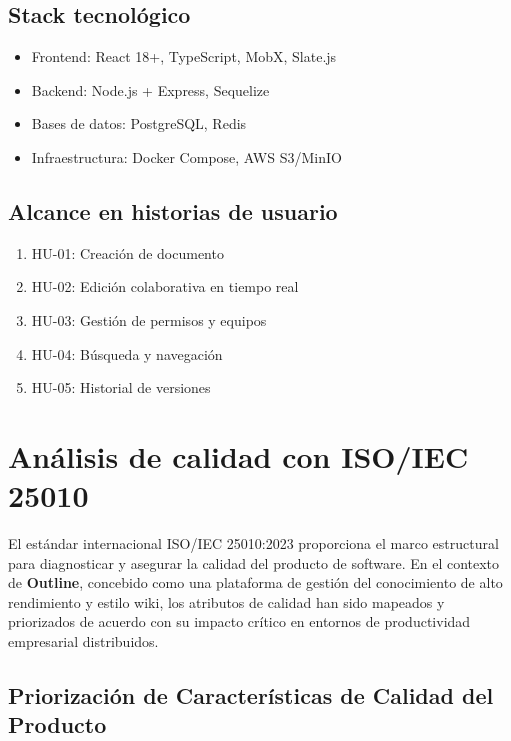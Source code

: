 \documentclass[12pt]{article}
\begin{document}
\subsection{Stack tecnológico}
\begin{itemize}
    \item Frontend: React 18+, TypeScript, MobX, Slate.js
    \item Backend: Node.js + Express, Sequelize
    \item Bases de datos: PostgreSQL, Redis
    \item Infraestructura: Docker Compose, AWS S3/MinIO
\end{itemize}

\subsection{Alcance en historias de usuario}
\begin{enumerate}
    \item HU-01: Creación de documento
    \item HU-02: Edición colaborativa en tiempo real
    \item HU-03: Gestión de permisos y equipos
    \item HU-04: Búsqueda y navegación
    \item HU-05: Historial de versiones
\end{enumerate}

\section{Análisis de calidad con ISO/IEC 25010}

El estándar internacional ISO/IEC 25010:2023 proporciona el marco estructural para diagnosticar y asegurar la calidad del producto de software. En el contexto de \textbf{Outline}, concebido como una plataforma de gestión del conocimiento de alto rendimiento y estilo wiki, los atributos de calidad han sido mapeados y priorizados de acuerdo con su impacto crítico en entornos de productividad empresarial distribuidos.

\subsection{Priorización de Características de Calidad del Producto}
\end{document}

